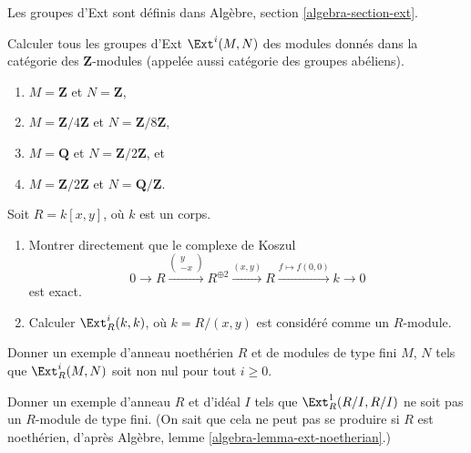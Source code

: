\noindent
Les groupes d'Ext sont définis dans Algèbre, section \ref{algebra-section-ext}.

\begin{exercise}
\label{exercise-compute-ext-abelian-groups}
Calculer tous les groupes d'Ext $\Ext^i(M, N)$ des modules donnés
dans la catégorie des $\mathbf{Z}$-modules
(appelée aussi catégorie des groupes abéliens).
\begin{enumerate}
\item $M = \mathbf{Z}$ et $N = \mathbf{Z}$,
\item $M = \mathbf{Z}/4\mathbf{Z}$ et $N = \mathbf{Z}/8\mathbf{Z}$,
\item $M = \mathbf{Q}$ et $N = \mathbf{Z}/2\mathbf{Z}$, et
\item $M = \mathbf{Z}/2\mathbf{Z}$ et $N = \mathbf{Q}/\mathbf{Z}$.
\end{enumerate}
\end{exercise}

\begin{exercise}
\label{exercise-compute-in-regular}
Soit $R = k[x, y]$, où $k$ est un corps.
\begin{enumerate}
\item Montrer directement que le complexe de Koszul
$$
0 \to R
\xrightarrow{
\left(
\begin{matrix}
y \\
-x
\end{matrix}
\right)
}
R^{\oplus 2} \xrightarrow{(x, y)} R \xrightarrow{f \mapsto f(0, 0)} k \to 0
$$
est exact.
\item Calculer $\Ext^i_R(k, k)$, où $k = R/(x, y)$ est considéré comme un $R$-module.
\end{enumerate}
\end{exercise}

\begin{exercise}
\label{exercise-infinitely-many-nonzero-ext}
Donner un exemple d'anneau noethérien $R$ et de modules de type fini $M$, $N$
tels que $\Ext^i_R(M, N)$ soit non nul pour tout $i \geq 0$.
\end{exercise}

\begin{exercise}
\label{exercise-infinite-ext}
Donner un exemple d'anneau $R$ et d'idéal $I$ tels que
$\Ext^1_R(R/I, R/I)$ ne soit pas un $R$-module de type fini.
(On sait que cela ne peut pas se produire si $R$ est noethérien, d'après
Algèbre, lemme \ref{algebra-lemma-ext-noetherian}.)
\end{exercise}







